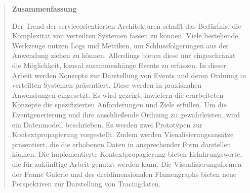 \documentclass[%
	BCOR=8.25mm,         %
	DIV=12,              %
	parskip=half,				 %
	bibliography=totoc,	 %
	headsepline=on,      %
	openany,
	ngerman
	]{scrbook}
\begin{document}
\pagestyle{empty}
\begin{quote}
	\vspace*{4cm}
	\begin{center}
		\textbf{\Large\sffamily Zusammenfassung}
	\end{center}
		Der Trend der serviceorientierten Architekturen schafft das Bedürfnis, die Komplexität von verteilten Systemen fassen zu können. Viele bestehende Werkzeuge nutzen Logs und Metriken, um Schlussfolgerungen aus der Anwendung ziehen zu können. Allerdings bieten diese nur eingeschränkt die Möglichkeit, kausal zusammenhänge Events zu erfassen. In dieser Arbeit werden Konzepte zur Darstellung von Events und deren Ordnung in verteilten Systemen präsentiert. Diese werden in praxisnahen Anwendungen eingesetzt. Es wird gezeigt, inwiefern die erarbeiteten Konzepte die spezifizierten Anforderungen und Ziele erfüllen. Um die Eventgenerierung und ihre anschließende Ordnung zu gewährleisten, wird ein Datenmodell beschrieben. Es werden zwei Prototypen zur Kontextpropagierung vorgestellt. Zudem werden Visualisierungsansätze präsentiert, die die erhobenen Daten in ansprechender Form darstellen können. Die implementierte Kontextpropagierung bieten Erfahrungswerte, die für zukünftige Arbeit genutzt werden kann. Die Visualisierungsformen der Frame Galerie und des dreidimensionalen Flamengraphs bieten neue Perspektiven zur Darstellung von Tracingdaten.
\end{quote}
\cleardoubleemptypage


\pagestyle{empty}
{
	\renewcommand{\thispagestyle}[1]{}
	\tableofcontents
}
\clearpage
\pagestyle{plain}

	\renewcommand{\thispagestyle}[1]{}
	\listoffigures
\clearpage
\pagestyle{plain}

	\renewcommand{\thispagestyle}[1]{}
	\lstlistoflistings
\clearpage
\pagestyle{plain}


\mainmatter 
\pagestyle{headings}







\backmatter 

\appendix
\printbibliography
\end{document}
